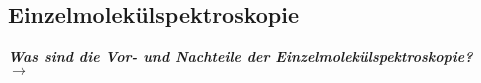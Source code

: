 \subsection{\label{subsec:FZV5}Einzelmolekülspektroskopie}
\textbf{\textit{Was sind die Vor- und Nachteile der Einzelmolekülspektroskopie?}} \\
$\rightarrow$